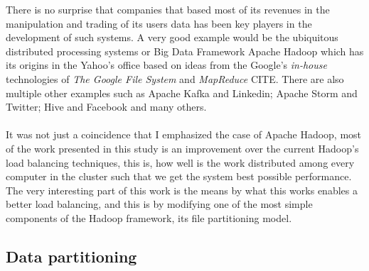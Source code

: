 There is no surprise that companies that based most of its revenues in the manipulation and trading of its users data has been key players in the development of such systems. A very good example would be the ubiquitous distributed processing systems or Big Data Framework Apache Hadoop which has its origins in the Yahoo's office based on ideas from the Google's \textit{in-house} technologies of \textit{The Google File System} and \textit{MapReduce} CITE. There are also multiple other examples such as Apache Kafka and Linkedin; Apache Storm and Twitter; Hive and Facebook and many others. \\ \\

It was not just a coincidence that I emphasized the case of Apache Hadoop, most of the work presented in this study is an improvement over the current Hadoop's load balancing techniques, this is, how well is the work distributed among every computer in the cluster such that we get the system best possible performance. The very interesting part of this work is the means by what this works enables a better load balancing, and this is by modifying one of the most simple components of the Hadoop framework, its file partitioning model.

\subsection{Data partitioning}

